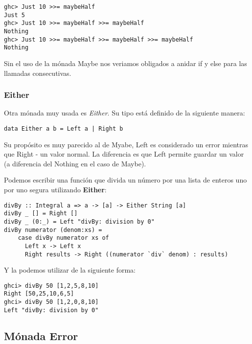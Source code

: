 \begin{lstlisting}
ghc> Just 10 >>= maybeHalf
Just 5
ghc> Just 10 >>= maybeHalf >>= maybeHalf
Nothing
ghc> Just 10 >>= maybeHalf >>= maybeHalf >>= maybeHalf
Nothing
\end{lstlisting}

Sin el uso de la mónada Maybe nos veriamos obligados a anidar if y else para las llamadas consecutivas.

\subsubsection{Either} %
\label{ssub:either}

Otra mónada muy usada es \textit{Either}. Su tipo está definido de la
siguiente manera:

\begin{lstlisting}
data Either a b = Left a | Right b
\end{lstlisting}

Su propósito es muy parecido al de Myabe, Left es considerado un error
mientras que Right - un valor normal. La diferencia es que Left permite
guardar un valor (a diferencia del Nothing en el caso de Maybe).

Podemos escribir una función que divida un número por una lista de enteros uno por uno segura utilizando \textbf{Either}:

\begin{lstlisting}
divBy :: Integral a => a -> [a] -> Either String [a]
divBy _ [] = Right []
divBy _ (0:_) = Left "divBy: division by 0"
divBy numerator (denom:xs) =
    case divBy numerator xs of
      Left x -> Left x
      Right results -> Right ((numerator `div` denom) : results)
\end{lstlisting}

Y la podemos utilizar de la siguiente forma:

\begin{lstlisting}
ghci> divBy 50 [1,2,5,8,10]
Right [50,25,10,6,5]
ghci> divBy 50 [1,2,0,8,10]
Left "divBy: division by 0"
\end{lstlisting}





\subsection{Mónada Error} %
\label{sub:m_nada_error}

